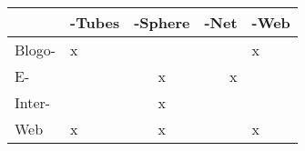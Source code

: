 \documentclass{article}
\begin{document}
\begin{tabular}{|l||l|c|r|p{1in}||}\hline
          & -Tubes & -Sphere & -Net &  -Web \\\hline
  Blogo-  &   x    &         &      &  x    \\
  E-      &        &   x     &  x   &       \\
  Inter-  &        &   x     &      &       \\
  Web     &   x    &   x     &      &  x    \\\hline
\end{tabular}
\end{document}
